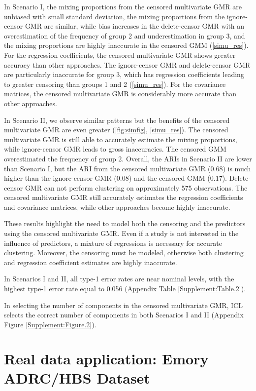 \documentclass{interact}
\theoremstyle{plain}
\theoremstyle{definition}
\theoremstyle{remark}
\begin{document}
In Scenario I, the mixing proportions from the censored multivariate GMR are unbiased with small standard deviation, the mixing proportions from the ignore-censor GMR are similar, while bias increases in the delete-censor GMR with an overestimation of the frequency of group 2 and underestimation in group 3, and the mixing proportions are highly inaccurate in the censored GMM (\cref{simu_res}). For the regression coefficients, the censored multivariate GMR shows greater accuracy than other approaches. The ignore-censor GMR and delete-censor GMR are particularly inaccurate for group 3, which has regression coefficients leading to greater censoring than groups 1 and 2 (\cref{simu_res}). For the covariance matrices, the censored multivariate GMR is considerably more accurate than other approaches.

In Scenario II, we observe similar patterns but the benefits of the censored multivariate GMR are even greater (\cref{fig:simfig}, \cref{simu_res}). The censored multivariate GMR is still able to accurately estimate the mixing proportions, while ignore-censor GMR leads to gross inaccuracies. The censored GMM overestimated the frequency of group 2. Overall, the ARIs in Scenario II are lower than Scenario I, but the ARI from the censored multivariate GMR (0.68) is much higher than the ignore-censor GMR (0.08) and the censored GMM (0.17). Delete-censor GMR can not perform clustering on approximately 575 observations. The censored multivariate GMR still accurately estimates the regression coefficients and covariance matrices, while other approaches become highly inaccurate. 

These results highlight the need to model both the censoring and the predictors using the censored multivariate GMR. Even if a study is not interested in the influence of predictors, a mixture of regressions is necessary for accurate clustering. Moreover, the censoring must be modeled, otherwise both clustering and regression coefficient estimates are highly inaccurate. 

In Scenarios I and II, all type-1 error rates are near nominal levels, with the highest type-1 error rate equal to 0.056 (Appendix Table \ref{Supplement:Table.2}). 

In selecting the number of components in the censored multivariate GMR, ICL selects the correct number of components in both Scenarios I and II (Appendix Figure \ref{Supplement:Figure.2}). 

    
\section{Real data application: Emory ADRC/HBS Dataset}
\label{sec:realdataanalysis}
\end{document}
